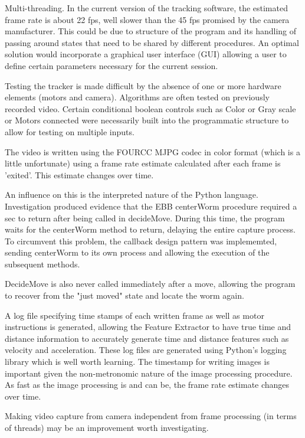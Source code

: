 \documentclass[main.tex]{subfiles}
\begin{document}
Multi-threading. In the current version of the tracking software, the estimated frame rate is about 22 fps, well slower than the 45 fps promised by the camera manufacturer. This could be due to structure of the program and its handling of passing around states that need to be shared by different procedures. An optimal solution would incorporate a graphical user interface (GUI) allowing a user to define certain parameters necessary for the current session.

Testing the tracker is made difficult by the absence of one or more hardware elements (motors and camera). Algorithms are often tested on previously recorded video. Certain conditional boolean controls such as Color or Gray scale or Motors connected were necessarily built into the programmatic structure to allow for testing on multiple inputs.

The video is written using the  FOURCC MJPG codec in color format (which is a little unfortunate) using a frame rate estimate calculated after each frame is 'exited'. This estimate changes over time.

An influence on this is the interpreted nature of the Python language. Investigation produced evidence that the EBB centerWorm procedure required a sec to return after being called in decideMove. During this time, the program waits for the centerWorm method to return, delaying the entire capture process. To circumvent this problem, the callback design pattern was implememted, sending centerWorm to its own process and allowing the execution of the subsequent methods.

DecideMove is also never called immediately after a move, allowing the program to recover from the "just moved" state and locate the worm again.

A log file specifying time stamps of each written frame as well as motor instructions is generated, allowing the Feature Extractor to have true time and distance information to accurately generate time and distance features such as velocity and acceleration. These log files are generated using Python's logging library which is well worth learning. The timestamp for writing images is important given the non-metronomic nature of the image processing procedure. As fast as the image processing is and can be, the frame rate estimate changes over time.

Making video capture from camera independent from frame processing (in terms of threads) may be an improvement worth investigating. 
\end{document}
